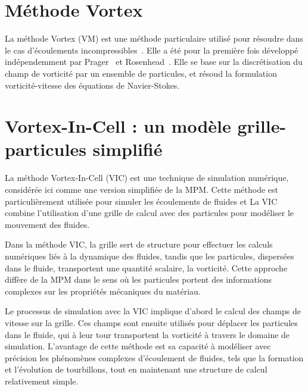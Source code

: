 \section{Méthode Vortex}

La méthode Vortex (VM) est une méthode particulaire utilisé pour résoudre  dans le cas d'écoulements incompressibles~\cite{Cottet_Koumoutsakos_2000}. Elle a été pour la première fois développé indépendemment par Prager~\cite{prager1928druckverteilung} et Rosenhead~\cite{rosenhead1931formation}. Elle se base sur la discrétisation du champ de vorticité par un ensemble de particules, et résoud la formulation vorticité-vitesse des équations de Navier-Stokes.
\section{Vortex-In-Cell : un modèle grille-particules simplifié}

La méthode Vortex-In-Cell (VIC) est une technique de simulation numérique, considérée ici comme une version simplifiée de la MPM. Cette méthode est particulièrement utilisée pour simuler les écoulements de fluides et La VIC combine l'utilisation d'une grille de calcul avec des particules pour modéliser le mouvement des fluides.

Dans la méthode VIC, la grille sert de structure pour effectuer les calculs numériques liés à la dynamique des fluides, tandis que les particules, dispersées dans le fluide, transportent une quantité scalaire, la vorticité. Cette approche diffère de la MPM dans le sens où les particules portent des informations complexes sur les propriétés mécaniques du matériau.

Le processus de simulation avec la VIC implique d'abord le calcul des champs de vitesse sur la grille. Ces champs sont ensuite utilisés pour déplacer les particules dans le fluide, qui à leur tour transportent la vorticité à travers le domaine de simulation. L'avantage de cette méthode est sa capacité à modéliser avec précision les phénomènes complexes d'écoulement de fluides, tels que la formation et l'évolution de tourbillons, tout en maintenant une structure de calcul relativement simple.